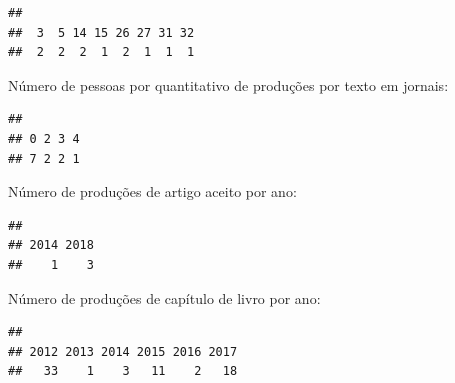 \documentclass[]{article}
\newenvironment{Shaded}{\begin{snugshade}}{\end{snugshade}}
\newcommand{\ControlFlowTok}[1]{\textcolor[rgb]{0.13,0.29,0.53}{\textbf{#1}}}
\newcommand{\KeywordTok}[1]{\textcolor[rgb]{0.13,0.29,0.53}{\textbf{#1}}}
\newcommand{\NormalTok}[1]{#1}
\newcommand{\OperatorTok}[1]{\textcolor[rgb]{0.81,0.36,0.00}{\textbf{#1}}}
\begin{document}
\begin{verbatim}
## 
##  3  5 14 15 26 27 31 32 
##  2  2  2  1  2  1  1  1
\end{verbatim}

Número de pessoas por quantitativo de produções por texto em jornais:

\begin{Shaded}
\end{Shaded}

\begin{verbatim}
## 
## 0 2 3 4 
## 7 2 2 1
\end{verbatim}

Número de produções de artigo aceito por ano:

\begin{Shaded}
\end{Shaded}

\begin{verbatim}
## 
## 2014 2018 
##    1    3
\end{verbatim}

Número de produções de capítulo de livro por ano:

\begin{Shaded}
\end{Shaded}

\begin{verbatim}
## 
## 2012 2013 2014 2015 2016 2017 
##   33    1    3   11    2   18
\end{verbatim}
\end{document}
